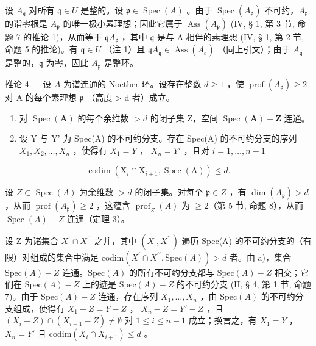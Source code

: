 设 \(A_{\mathfrak{q}}\) 对所有 \(\mathfrak{q} \in U\) 是整的。设 \(\mathfrak{p} \in \operatorname{Spec}(A)\) 。由于 \(\operatorname{Spec}(A_{\mathfrak{p}})\) 不可约，\(A_{\mathfrak{p}}\) 的诣零根是 \(A_{\mathfrak{p}}\) 的唯一极小素理想；因此它属于 \(\operatorname{Ass}(A_{\mathfrak{p}})\) (IV, § 1, 第 3 节, 命题 7 的推论 1)，从而等于 \(\mathfrak{q}A_{\mathfrak{p}}\) ，其中 \(\mathfrak{q}\) 是与 A 相伴的素理想 (IV, § 1, 第 2 节, 命题 5 的推论)。有 \(\mathfrak{q} \in U\) （注 1）且 \(\mathfrak{q}A_{\mathfrak{q}} \in \operatorname{Ass}(A_{\mathfrak{q}})\) （同上引文）；由于 \(A_{\mathfrak{q}}\) 是整的，\(\mathfrak{q}\) 为零，因此 \(A_{\mathfrak{p}}\) 是整环。

推论 4.--- 设 \(A\) 为谱连通的 Noether 环。设存在整数 \(d \geqslant 1\) ，使 \(\operatorname{prof}(A_{\mathfrak{p}}) \geqslant 2\) 对 A 的每个素理想 \(\mathfrak{p}\) （高度 \textgreater{} d 者）成立。

\begin{enumerate}
\def\labelenumi{\alph{enumi})}
\item
  对 \(\operatorname{Spec}(\mathbf{A})\) 的每个余维数 \(>d\) 的闭子集 Z，空间 \(\operatorname{Spec}(\mathbf{A}) - \mathbf{Z}\) 连通。
\item
  设 Y 与 Y' 为 Spec(A) 的不可约分支。存在 Spec(A) 的不可约分支的序列 \(X_{1}, X_{2}, \ldots, X_{n}\) ，使得有 \(X_{1} = Y\) ， \(X_{n} = Y'\) ，且对 \(i = 1, \ldots, n - 1\)
\end{enumerate}

\[
\operatorname{codim} \left(\mathrm{X} _ {i} \cap \mathrm{X} _ {i + 1}, \operatorname{Spec} (\mathrm{A})\right) \leqslant d.
\]

设 \(Z \subset \operatorname{Spec}(A)\) 为余维数 \(>d\) 的闭子集。对每个 \(\mathfrak{p} \in Z\) ，有 \(\dim(A_{\mathfrak{p}}) > d\) ，从而 \(\operatorname{prof}(A_{\mathfrak{p}}) \geqslant 2\) ，这蕴含 \(\operatorname{prof}_{Z}(A)\) 为 \(\geqslant 2\)（第 5 节, 命题 8），从而 \(\operatorname{Spec}(A) - Z\) 连通（定理 3）。

设 Z 为诸集合 \(X^{\prime} \cap X^{\prime\prime}\) 之并，其中 \((X^{\prime}, X^{\prime\prime})\) 遍历 Spec(A) 的不可约分支的（有限）对组成的集合中满足 \(\text{codim}(X^{\prime} \cap X^{\prime\prime}, \text{Spec}(A)) > d\) 者。由 a)，集合 \(\text{Spec}(A) - Z\) 连通。\(\text{Spec}(A)\) 的所有不可约分支都与 \(\text{Spec}(A) - Z\) 相交；它们在 \(\text{Spec}(A) - Z\) 上的迹是 \(\text{Spec}(A) - Z\) 的不可约分支 (II, § 4, 第 1 节, 命题 7)。由于 \(\text{Spec}(A) - Z\) 连通，存在序列 \(X_{1}, \ldots, X_{n}\) ，由 \(\text{Spec}(A)\) 的不可约分支组成，使得有 \(X_{1} - Z = Y - Z\) ， \(X_{n} - Z = Y' - Z\) ，且 \((X_{i} - Z) \cap (X_{i+1} - Z) \neq \emptyset\) 对 \(1 \leqslant i \leqslant n - 1\) 成立；换言之，有 \(X_{1} = Y\) ， \(X_{n} = Y'\) 且 \(\text{codim}(X_{i} \cap X_{i+1}) \leqslant d\) 。

